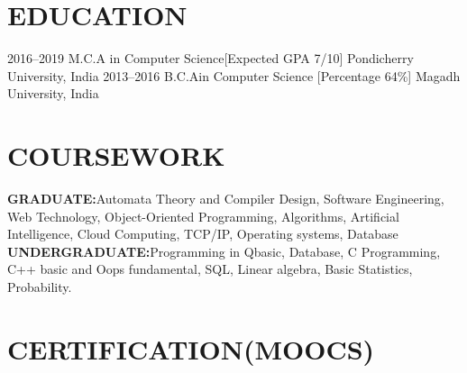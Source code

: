 \documentclass[]{cv-style}          %
\begin{document}


\section{EDUCATION}

\begin{entrylist}
\entry
{2016--2019}
{M.C.A {\normalfont in Computer Science}[Expected GPA 7/10]}
{Pondicherry University, India}
{\vspace{-0.3cm}}
\entry
{2013--2016}
{B.C.A{\normalfont in Computer Science} [Percentage 64\%]}
{Magadh University, India}

\end{entrylist}




\section{COURSEWORK}
 \vspace{-0.2cm}

\textbf{GRADUATE:}Automata Theory and Compiler Design, Software Engineering, Web Technology, Object-Oriented Programming, Algorithms, Artificial Intelligence, Cloud Computing, TCP/IP, Operating systems, Database\newline
\textbf{UNDERGRADUATE:}Programming in Qbasic, Database, C Programming, C++ basic and Oops fundamental, SQL, Linear algebra, Basic Statistics, Probability.


 





\section{CERTIFICATION(MOOCS)}
\end{document}
